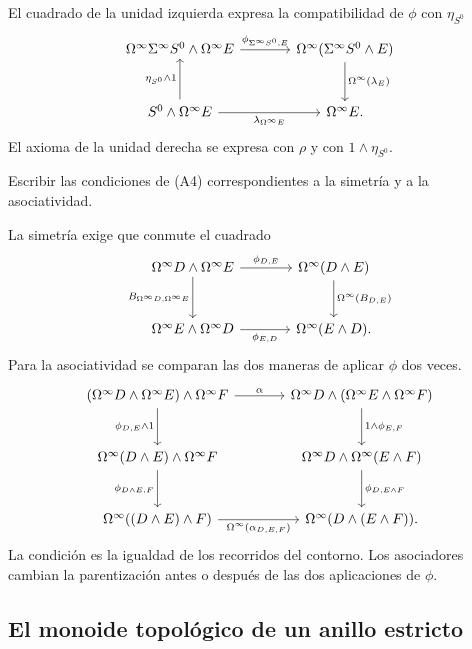 El cuadrado de la unidad izquierda expresa la compatibilidad de $\phi$ con $\eta_{S^0}$
\[
\begin{tikzcd}[column sep=large,row sep=large]
\Omega^\infty\Sigma^\infty S^0\wedge\Omega^\infty E
\arrow[r,"\phi_{\Sigma^\infty S^0,E}"]&
\Omega^\infty(\Sigma^\infty S^0\wedge E)\arrow[d,"\Omega^\infty(\lambda_E)"]\\
S^0\wedge\Omega^\infty E\arrow[u,"\eta_{S^0}\wedge1"]
\arrow[r,"\lambda_{\Omega^\infty E}"']&\Omega^\infty E .
\end{tikzcd}
\]
El axioma de la unidad derecha se expresa con $\rho$ y con $1\wedge\eta_{S^0}$.

\begin{ejer}\label{ejer:c26-coherencia-a4}
Escribir las condiciones de (A4) correspondientes a la simetría y a la asociatividad.
\end{ejer}
\begin{sol}
La simetría exige que conmute el cuadrado
\[
\begin{tikzcd}[column sep=large,row sep=large]
\Omega^\infty D\wedge \Omega^\infty E\arrow[r,"\phi_{D,E}"]\arrow[d,"B_{\Omega^\infty D,\Omega^\infty E}"']&
\Omega^\infty(D\wedge E)\arrow[d,"\Omega^\infty(B_{D,E})"]\\
\Omega^\infty E\wedge \Omega^\infty D\arrow[r,"\phi_{E,D}"']&\Omega^\infty(E\wedge D).
\end{tikzcd}
\]
Para la asociatividad se comparan las dos maneras de aplicar $\phi$ dos veces.
\[
\begin{tikzcd}[column sep=large,row sep=large]
(\Omega^\infty D\wedge \Omega^\infty E)\wedge \Omega^\infty F
\arrow[d,"\phi_{D,E}\wedge1"']
\arrow[r,"\alpha"]&
\Omega^\infty D\wedge(\Omega^\infty E\wedge \Omega^\infty F)\arrow[d,"1\wedge\phi_{E,F}"]\\
\Omega^\infty(D\wedge E)\wedge \Omega^\infty F\arrow[d,"\phi_{D\wedge E,F}"']&
\Omega^\infty D\wedge \Omega^\infty(E\wedge F)\arrow[d,"\phi_{D,E\wedge F}"]\\
\Omega^\infty((D\wedge E)\wedge F)\arrow[r,"\Omega^\infty(\alpha_{D,E,F})"']&
\Omega^\infty(D\wedge(E\wedge F)).
\end{tikzcd}
\]
La condición es la igualdad de los recorridos del contorno. Los asociadores cambian la parentización antes o después de las dos aplicaciones de $\phi$.
\end{sol}

\subsection{El monoide topológico de un anillo estricto}

